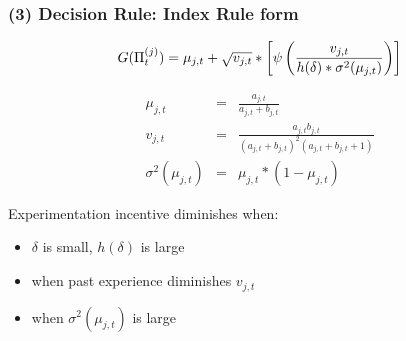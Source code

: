 \documentclass[xcolor=pdftex,dvipsnames,table,mathserif,aspectratio=169]{beamer}
\begin{document}
\begin{frame}
\frametitle{(3) Decision Rule: Index Rule form}

\[
G(\Pi _{t}^{(j)})=\mu _{j,t}+\sqrt{v_{j,t}}*\left[\psi \left( \frac{v_{j,t}}{%
h(\delta)\ast \sigma ^{2}(\mu _{j,t})}\right)\right]
\]

\begin{eqnarray*}
\mu _{j,t} &=&\frac{a_{j,t}}{a_{j,t}+b_{j,t}} \\
v_{j,t} &=&\frac{a_{j,t}b_{j,t}}{(a_{j,t}+b_{j,t})^{2}(a_{j,t}+b_{j,t}+1)} \\
\sigma ^{2}(\mu _{j,t}) &=&\mu _{j,t}\ast (1-\mu _{j,t})
\end{eqnarray*}

Experimentation incentive diminishes when:

\begin{itemize}
\item $\delta $ is small, $h(\delta)$ is large

\item when past experience diminishes $v_{j,t}$

\item when $\sigma ^{2}(\mu _{j,t})$ is large
\end{itemize}
\end{frame}

\end{document}
